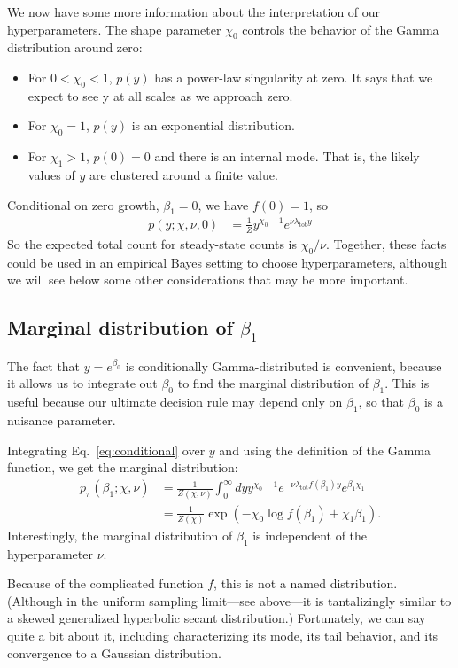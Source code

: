 \documentclass[12pt, letterpaper]{article}
\newcommand{ \lambtot }{\lambda_{\text{tot}}}
\begin{document}
We now have some more information about the interpretation of our hyperparameters.
The shape parameter $\chi_0$ controls the behavior of the Gamma distribution around zero:
\begin{itemize}
    \item For $0 < \chi_0 < 1$, $p(y)$ has a power-law singularity at zero. It says that we expect to see y at all scales as we approach zero.
    \item For $\chi_0 = 1$, $p(y)$ is an exponential distribution.
    \item For $\chi_1 > 1$, $p(0) = 0$ and there is an internal mode. That is, the likely values of $y$ are clustered around a finite value.
\end{itemize}
Conditional on zero growth, $\beta_1 = 0$, we have $f(0) = 1$, so
\begin{align}
    p(y; \chi, \nu, 0) & = \frac{1}{Z} y^{\chi_0 - 1} e^{\nu \lambtot y}
\end{align}
So the expected total count for steady-state counts is $\chi_0 / \nu$.
Together, these facts could be used in an empirical Bayes setting to choose hyperparameters,
although we will see below some other considerations that may be more important.

\subsection{Marginal distribution of $\beta_1$}

The fact that $y = e^{\beta_0}$ is conditionally Gamma-distributed is convenient, because it allows us to integrate out $\beta_0$ to find the marginal distribution of $\beta_1$.
This is useful because our ultimate decision rule may depend only on $\beta_1$, so that $\beta_0$ is a nuisance parameter.

Integrating Eq.~\ref{eq:conditional} over $y$ and using the definition of the Gamma function, we get the marginal distribution:
\begin{align}
    p_\pi(\beta_1; \chi, \nu) &= \frac{1}{Z(\chi, \nu)} \int_0^\infty dy y^{\chi_0 - 1} e^{-\nu \lambtot f(\beta_1) y} e^{\beta_1 \chi_1} \\
                              &= \frac{1}{Z(\chi)} \exp \left( - \chi_0 \log f(\beta_1) + \chi_1 \beta_1 \right).
                              \label{eq:marginal}
\end{align}
Interestingly, the marginal distribution of $\beta_1$ is independent of the hyperparameter $\nu$.

Because of the complicated function $f$, this is not a named distribution.
(Although in the uniform sampling limit---see above---it is tantalizingly similar to a skewed generalized hyperbolic secant distribution.)
Fortunately, we can say quite a bit about it, including characterizing its mode, its tail behavior, and its convergence to a Gaussian distribution.
\end{document}
